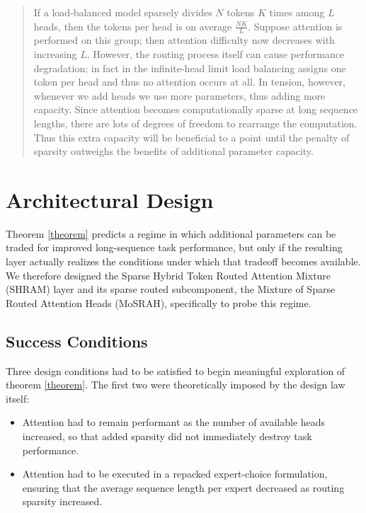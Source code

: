 \documentclass[11pt]{article}
\begin{document}
\begin{quote}
If a load-balanced model sparsely divides $N$ tokens $K$ times among $L$ heads, then the tokens per head is on average $\frac{NK}{L}$. Suppose attention is performed on this group; then attention difficulty now decreases with increasing $L$. However, the routing process itself can cause performance degradation; in fact in the infinite-head limit load balancing assigns one token per head and thus no attention occurs at all. In tension, however, whenever we add heads we use more parameters, thus adding more capacity. Since attention becomes computationally sparse at long sequence lengths, there are lots of degrees of freedom to rearrange the computation. Thus this extra capacity will be beneficial to a point until the penalty of sparsity outweighs the benefits of additional parameter capacity.
\end{quote}

\section{Architectural Design}
\label{sec:design}

Theorem \ref{theorem} predicts a regime in which additional parameters can be traded for improved long-sequence task performance, but only if the resulting layer actually realizes the conditions under which that tradeoff becomes available. We therefore designed the Sparse Hybrid Token Routed Attention Mixture (SHRAM) layer and its sparse routed subcomponent, the Mixture of Sparse Routed Attention Heads (MoSRAH), specifically to probe this regime.

\subsection{Success Conditions}
\label{sec:design_success}

Three design conditions had to be satisfied to begin meaningful exploration of theorem \ref{theorem}. The first two were theoretically imposed by the design law itself:

\begin{itemize}
    \item Attention had to remain performant as the number of available heads increased, so that added sparsity did not immediately destroy task performance.
    \item Attention had to be executed in a repacked expert-choice formulation, ensuring that the average sequence length per expert decreased as routing sparsity increased.
\end{itemize}
\end{document}
